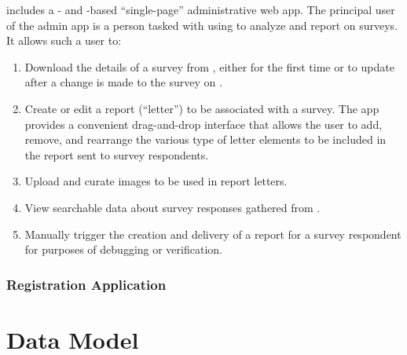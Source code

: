 \documentclass{article}
\begin{document}
\caper{} includes a \vue{}- and \vuetify{}-based
``single-page''
administrative web app.
The principal user of the admin app
is a person tasked with using \caper{}
to analyze and report on \qual{} surveys.
It allows such a user to:
\begin{enumerate}
\item Download the details of a survey from \qual{},
  either for the first time or to update \caper{} after a change is made to the survey on \qual.
\item Create or edit a report (``letter'') to be associated with a survey.
  The app provides a convenient drag-and-drop interface
  that allows the user to add, remove, and rearrange the various type of
  letter elements to be included in the report sent to survey respondents.
\item Upload and curate images to be used in report letters.
\item View searchable data about survey responses gathered from \qual.
\item Manually trigger the creation and delivery of a report for a survey respondent
  for purposes of debugging or verification.
\end{enumerate}

\subsubsection{Registration Application}
\label{sec:group-app}

\section{Data Model}
\label{sec:data-model-overview}
\end{document}
